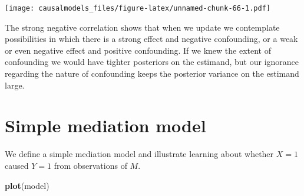 \documentclass[
  12pt,
]{book}
\newenvironment{Shaded}{\begin{snugshade}}{\end{snugshade}}
\newcommand{\DataTypeTok}[1]{\textcolor[rgb]{0.13,0.29,0.53}{#1}}
\newcommand{\DecValTok}[1]{\textcolor[rgb]{0.00,0.00,0.81}{#1}}
\newcommand{\FloatTok}[1]{\textcolor[rgb]{0.00,0.00,0.81}{#1}}
\newcommand{\KeywordTok}[1]{\textcolor[rgb]{0.13,0.29,0.53}{\textbf{#1}}}
\newcommand{\NormalTok}[1]{#1}
\newcommand{\OperatorTok}[1]{\textcolor[rgb]{0.81,0.36,0.00}{\textbf{#1}}}
\newcommand{\StringTok}[1]{\textcolor[rgb]{0.31,0.60,0.02}{#1}}
\begin{document}
\texttt{[image: causalmodels\_files/figure-latex/unnamed-chunk-66-1.pdf]}

The strong negative correlation shows that when we update we contemplate possibilities in which there is a strong effect and negative confounding, or a weak or even negative effect and positive confounding. If we knew the extent of confounding we would have tighter posteriors on the estimand, but our ignorance regarding the nature of confounding keeps the posterior variance on the estimand large.

\hypertarget{simple-mediation-model}{%
\section{Simple mediation model}\label{simple-mediation-model}}

We define a simple mediation model and illustrate learning about whether \(X=1\) caused \(Y=1\) from observations of \(M\).

\begin{Shaded}
\end{Shaded}

\begin{Shaded}
\begin{Highlighting}[]
\KeywordTok{plot}\NormalTok{(model)}
\end{Highlighting}
\end{Shaded}
\end{document}

